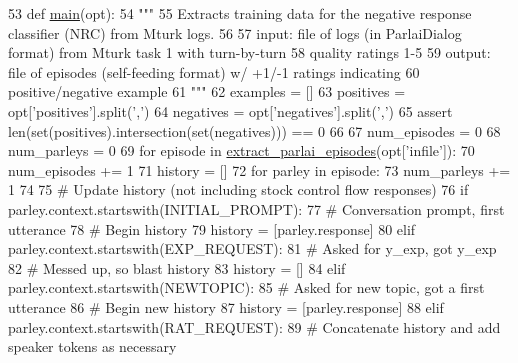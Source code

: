 \begin{DoxyCode}
53 \textcolor{keyword}{def }\hyperlink{namespaceprojects_1_1self__feeding_1_1scripts_1_1convert__chatted__to__polarized_ac770e55a3dab688df1d4df65d7d5263b}{main}(opt):
54     \textcolor{stringliteral}{"""}
55 \textcolor{stringliteral}{    Extracts training data for the negative response classifier (NRC) from Mturk logs.}
56 \textcolor{stringliteral}{}
57 \textcolor{stringliteral}{    input: file of logs (in ParlaiDialog format) from Mturk task 1 with turn-by-turn}
58 \textcolor{stringliteral}{        quality ratings 1-5}
59 \textcolor{stringliteral}{    output: file of episodes (self-feeding format) w/ +1/-1 ratings indicating}
60 \textcolor{stringliteral}{        positive/negative example}
61 \textcolor{stringliteral}{    """}
62     examples = []
63     positives = opt[\textcolor{stringliteral}{'positives'}].split(\textcolor{stringliteral}{','})
64     negatives = opt[\textcolor{stringliteral}{'negatives'}].split(\textcolor{stringliteral}{','})
65     \textcolor{keyword}{assert} len(set(positives).intersection(set(negatives))) == 0
66 
67     num\_episodes = 0
68     num\_parleys = 0
69     \textcolor{keywordflow}{for} episode \textcolor{keywordflow}{in} \hyperlink{namespaceprojects_1_1self__feeding_1_1utils_a7bfa2fe610a2d0da7968b1a2662e0c23}{extract\_parlai\_episodes}(opt[\textcolor{stringliteral}{'infile'}]):
70         num\_episodes += 1
71         history = []
72         \textcolor{keywordflow}{for} parley \textcolor{keywordflow}{in} episode:
73             num\_parleys += 1
74 
75             \textcolor{comment}{# Update history (not including stock control flow responses)}
76             \textcolor{keywordflow}{if} parley.context.startswith(INITIAL\_PROMPT):
77                 \textcolor{comment}{# Conversation prompt, first utterance}
78                 \textcolor{comment}{# Begin history}
79                 history = [parley.response]
80             \textcolor{keywordflow}{elif} parley.context.startswith(EXP\_REQUEST):
81                 \textcolor{comment}{# Asked for y\_exp, got y\_exp}
82                 \textcolor{comment}{# Messed up, so blast history}
83                 history = []
84             \textcolor{keywordflow}{elif} parley.context.startswith(NEWTOPIC):
85                 \textcolor{comment}{# Asked for new topic, got a first utterance}
86                 \textcolor{comment}{# Begin new history}
87                 history = [parley.response]
88             \textcolor{keywordflow}{elif} parley.context.startswith(RAT\_REQUEST):
89                 \textcolor{comment}{# Concatenate history and add speaker tokens as necessary}

\end{DoxyCode}

